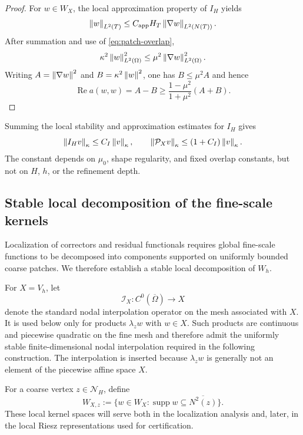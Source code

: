 \begin{proof}
For $w\in W_X$, the local approximation property of $I_H$ yields
\[
  \left\lVert w\right\rVert_{L^2(T)}
  \leq C_{\mathrm{app}}H_T
       \left\lVert \nabla w\right\rVert_{L^2(N(T))}.
\]
After summation and use of \eqref{eq:patch-overlap},
\[
  \kappa^2\left\lVert w\right\rVert_{L^2(\Omega)}^2
  \leq\mu^2\left\lVert \nabla w\right\rVert_{L^2(\Omega)}^2.
\]
Writing $A=\left\lVert \nabla w\right\rVert^2$ and
$B=\kappa^2\left\lVert w\right\rVert^2$, one has $B\leq\mu^2A$ and hence
\[
  \operatorname{Re}a(w,w)=A-B
  \geq\frac{1-\mu^2}{1+\mu^2}(A+B).
\]
\end{proof}

Summing the local stability and approximation estimates for $I_H$ gives
\begin{equation}
\label{eq:projection-stability}
  \left\lVert I_Hv\right\rVert_\kappa\leq C_I\left\lVert v\right\rVert_\kappa,
  \qquad
  \left\lVert \mathcal P_Xv\right\rVert_\kappa\leq(1+C_I)\left\lVert v\right\rVert_\kappa.
\end{equation}
The constant depends on $\mu_0$, shape regularity, and fixed overlap
constants, but not on $H$, $h$, or the refinement depth.

\subsection{Stable local decomposition of the fine-scale kernels}
\label{sec:stable-decomposition}

Localization of correctors and residual functionals requires global
fine-scale functions to be decomposed into components supported on
uniformly bounded coarse patches. We therefore establish a stable local
decomposition of $W_h$.

For $X=V_h$, let
\[
  \mathcal I_X:C^0(\overline\Omega)\to X
\]
denote the standard nodal interpolation operator on the mesh associated
with $X$. It is used below only for products $\lambda_z w$ with
$w\in X$. Such products are continuous and piecewise quadratic on the
fine mesh and therefore admit the uniformly stable finite-dimensional
nodal interpolation required in the following construction. The
interpolation is inserted because $\lambda_z w$ is generally not an
element of the piecewise affine space $X$.

For a coarse vertex $z\in\mathcal N_H$, define
\begin{equation}
\label{eq:local-kernel-space}
  W_{X,z}
  :=
  \bigl\{
    w\in W_X:
    \operatorname{supp}w
    \subseteq
    \overline{N^2(z)}
  \bigr\}.
\end{equation}
These local kernel spaces will serve both in the localization analysis
and, later, in the local Riesz representations used for certification.

